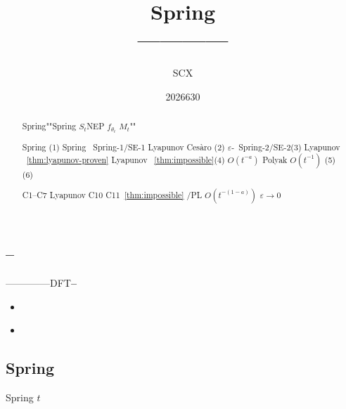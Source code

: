 \title{\textbf{Spring}\\
       {\large ————}}

\author{SCX}

\date{2026630}


\maketitle

% 
\begin{abstract}
 Spring""Spring  $S_t$NEP  $f_{\theta_t}$ $M_t$""

 Spring (1) Spring ~Spring-1/SE-1 Lyapunov  Ces\`{a}ro (2)  $\varepsilon$-~Spring-2/SE-2(3)  Lyapunov ~\ref{thm:lyapunov-proven} Lyapunov \textbf{}~\ref{thm:impossible}(4) $O(t^{-a})$ Polyak  $O(t^{-1})$ (5) (6) 

 C1--C7 Lyapunov  C10 C11~\ref{thm:impossible} /PL  $O(t^{-(1-a)})$ $\varepsilon \to 0$ 
\end{abstract}

\section{}

\subsection{--}

——--——DFT\textbf{--}

\begin{itemize}[nosep]
    \item \textbf{}
    \item \textbf{}
\end{itemize}

 \citep{settles2009} \citep{srinivas2010}  \citep{natarajan2013} \textit{}

\subsection{Spring }

Spring\textit{} $t$

